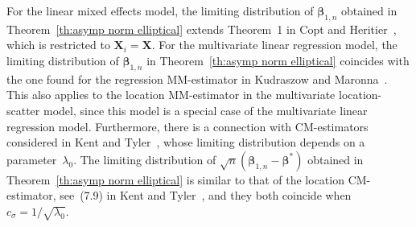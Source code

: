 \documentclass{article}
\numberwithin{equation}{section}
\theoremstyle{plain}
\newcommand{\bbeta}{\bm\beta}
\newcommand{\bX}{\mathbf{X}}
\begin{document}
For the linear mixed effects model, the limiting distribution of $\bbeta_{1,n}$ obtained in Theorem~\ref{th:asymp norm elliptical}
extends Theorem~1 in Copt and Heritier~\cite{copt&heritier2007}, which is restricted to $\bX_i=\bX$.
For the multivariate linear regression model, the limiting distribution of $\bbeta_{1,n}$ in 
Theorem~\ref{th:asymp norm elliptical} coincides with the one found for the regression MM-estimator in 
Kudraszow and Maronna~\cite{kudraszow-maronna2011}. 
This also applies to the location MM-estimator in the multivariate location-scatter model, 
since this model is a special case of the multivariate linear regression model.
Furthermore, there is a connection with CM-estimators considered in
Kent and Tyler~\cite{kent&tyler1996},
whose limiting distribution depends on a parameter~$\lambda_0$.
The limiting distribution of $\sqrt{n}(\bbeta_{1,n}-\bbeta^*)$ obtained in Theorem~\ref{th:asymp norm elliptical} 
is similar to that of the location CM-estimator, see~(7.9) in Kent and Tyler~\cite{kent&tyler1996},
and they both coincide when $c_\sigma=1/\sqrt{\lambda_0}$.
\end{document}
